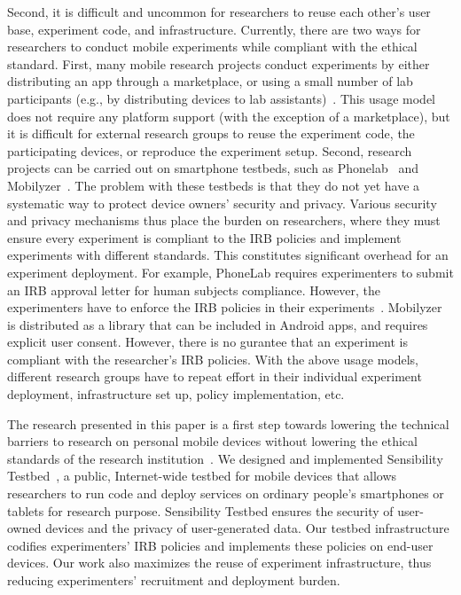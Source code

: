 Second, it is difficult and uncommon for researchers to reuse each 
other's user base, experiment code, and infrastructure. 
Currently, there are two ways for researchers to conduct mobile 
experiments while compliant with the ethical standard. 
First, many mobile research projects conduct experiments 
by either distributing an app through a marketplace, or using a 
small number of lab participants (e.g., by distributing devices to 
lab assistants)~\cite{hao2013isleep, wang2012no, 
wang2013sensing}. This usage model does not require any 
platform support (with the exception of a marketplace), but it 
is difficult for external research groups to reuse the experiment 
code, the participating devices, or reproduce the experiment 
setup. Second, research projects can be carried out on 
smartphone testbeds, such as Phonelab~\cite{phonelab, 
nandugudi2013phonelab} and 
Mobilyzer~\cite{nikravesh2015mobilyzer}. 
The problem with these testbeds is that they do not  yet
have a systematic way to protect device owners' security and 
privacy. Various security and privacy mechanisms thus place 
the burden on researchers, where they must ensure every 
experiment is compliant to the IRB policies and implement 
experiments with different standards. This constitutes
significant overhead for an experiment deployment. For example, 
PhoneLab requires experimenters to 
submit an IRB approval letter for human subjects compliance. 
However, the experimenters have to enforce the IRB policies in their 
experiments~\cite{nandugudi2013phonelab}. 
Mobilyzer~\cite{nikravesh2015mobilyzer} is distributed 
as a library that can be included in Android apps, and requires 
explicit user consent. However, there is no gurantee that an 
experiment is compliant with the researcher's IRB policies.
With the above usage models, 
different research groups have to repeat effort in their individual 
experiment deployment, infrastructure set up, policy implementation, etc. 

					
The research presented in this paper is a first step towards lowering the technical
barriers to research on personal mobile devices without lowering the
ethical standards of the research institution~\cite{zevenbergen2013ethical}. 
We designed and implemented 
Sensibility Testbed~\cite{sensibility, zhuang2014sensibility}, a 
public, Internet-wide testbed for mobile devices that
allows researchers to run code and deploy services on ordinary
people's smartphones or tablets for research purpose. Sensibility Testbed ensures
the security of user-owned devices and the privacy of
user-generated data. Our testbed 
infrastructure codifies experimenters' IRB policies and 
implements these policies on end-user devices. Our work also 
maximizes the reuse of experiment infrastructure, thus reducing 
experimenters' recruitment and deployment burden. 

